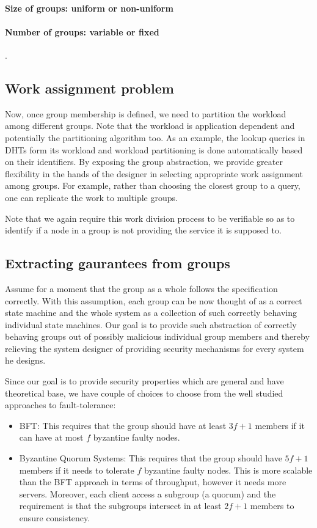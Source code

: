 \paragraph{Size of groups: uniform or non-uniform}

\paragraph{Number of groups: variable or fixed} .

\subsection{Work assignment problem}
Now, once group membership is defined, we need to partition the workload among different groups. Note that the workload is application dependent and potentially the partitioning algorithm too. As an example, the lookup queries in DHTs form its workload and workload partitioning is done automatically based on their identifiers. By exposing the group abstraction, we provide greater flexibility in the hands of the designer in selecting appropriate work assignment among groups. For example, rather than choosing the closest group to a query, one can replicate the work to multiple groups.

Note that we again require this work division process to be verifiable so as to identify if a node in a group is not providing the service it is supposed to.

\subsection{Extracting gaurantees from groups}
Assume for a moment that the group as a whole follows the specification correctly. With this assumption, each group can be now thought of as a correct state machine and the whole system as a collection of such correctly behaving individual state machines. Our goal is to provide such abstraction of correctly behaving groups out of possibly malicious individual group members and thereby relieving the system designer of providing security mechanisms for every system he designs.

Since our goal is to provide security properties which are general and have theoretical base, we have couple of choices to choose from the well studied approaches to fault-tolerance:
\begin{itemize}
\item{BFT:} This requires that the group should have at least $3f+1$ members if it can have at most $f$ byzantine faulty nodes.
\item{Byzantine Quorum Systems:}  This requires that the group should have $5f+1$ members if it needs to tolerate $f$ byzantine faulty nodes. This is more scalable than the BFT approach in terms of throughput, however it needs more servers. Moreover, each client access a subgroup (a quorum) and the requirement is that the subgroups intersect in at least $2f+1$ members to ensure consistency.
\end{itemize}


